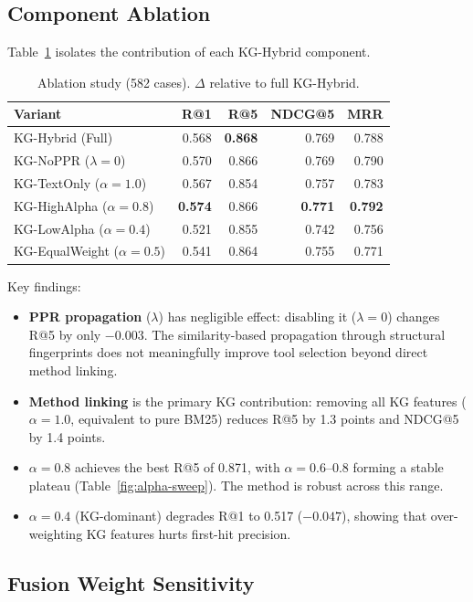 \documentclass[11pt,a4paper]{article}
\begin{document}
\subsection{Component Ablation}

Table~\ref{tab:ablation} isolates the contribution of each KG-Hybrid component.

\begin{table}[t]
\centering
\caption{Ablation study (582 cases). $\Delta$ relative to full KG-Hybrid.}
\label{tab:ablation}
\begin{tabular}{lrrrr}
\toprule
Variant & R@1 & R@5 & NDCG@5 & MRR \\
\midrule
KG-Hybrid (Full) & 0.568 & \textbf{0.868} & 0.769 & 0.788 \\
KG-NoPPR ($\lambda=0$) & 0.570 & 0.866 & 0.769 & 0.790 \\
KG-TextOnly ($\alpha=1.0$) & 0.567 & 0.854 & 0.757 & 0.783 \\
KG-HighAlpha ($\alpha=0.8$) & \textbf{0.574} & 0.866 & \textbf{0.771} & \textbf{0.792} \\
KG-LowAlpha ($\alpha=0.4$) & 0.521 & 0.855 & 0.742 & 0.756 \\
KG-EqualWeight ($\alpha=0.5$) & 0.541 & 0.864 & 0.755 & 0.771 \\
\bottomrule
\end{tabular}
\end{table}

Key findings:
\begin{itemize}
  \item \textbf{PPR propagation} ($\lambda$) has negligible effect: disabling it ($\lambda=0$) changes R@5 by only $-0.003$. The similarity-based propagation through structural fingerprints does not meaningfully improve tool selection beyond direct method linking.
  \item \textbf{Method linking} is the primary KG contribution: removing all KG features ($\alpha=1.0$, equivalent to pure BM25) reduces R@5 by 1.3 points and NDCG@5 by 1.4 points.
  \item \textbf{$\alpha=0.8$} achieves the best R@5 of 0.871, with $\alpha=0.6$--$0.8$ forming a stable plateau (Table~\ref{fig:alpha-sweep}). The method is robust across this range.
  \item \textbf{$\alpha=0.4$} (KG-dominant) degrades R@1 to 0.517 ($-0.047$), showing that over-weighting KG features hurts first-hit precision.
\end{itemize}

\subsection{Fusion Weight Sensitivity}
\end{document}
